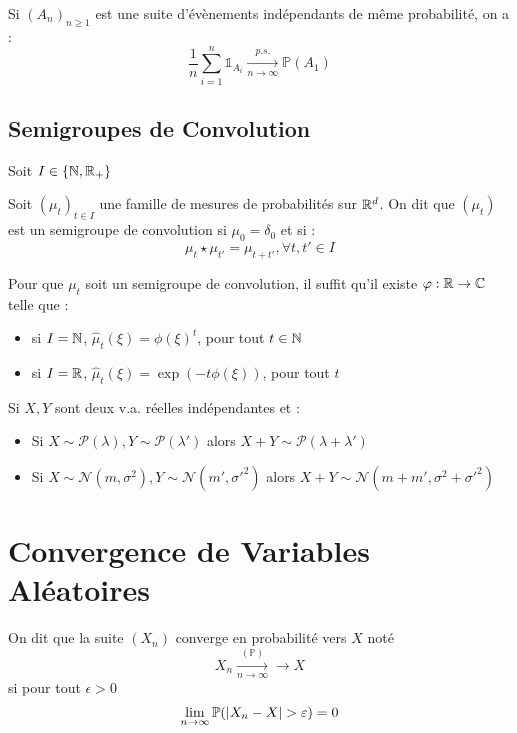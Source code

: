 \documentclass{cours}
\begin{document}
\begin{corollary}
    Si $\left(A_{n}\right)_{n \geq 1}$ est une suite d'évènements indépendants de même probabilité, on a :
    \[
        \frac{1}{n}\sum_{i = 1}^{n}\mathds{1}_{A_{i}} \xrightarrow[n \to \infty]{p.s.} \mathbb{P}(A_{1})
    \]
\end{corollary}

\subsection{Semigroupes de Convolution}
Soit $I \in \left\{\mathbb{N}, \mathbb{R}_{+}\right\}$
\begin{definition}
    Soit $(\mu_{t})_{t\in I}$ une famille de mesures de probabilités sur $\mathbb{R}^{d}$. On dit que $\left(\mu_{t}\right)$ est un semigroupe de convolution si $\mu_{0} = \delta_{0}$ et si :
    \[
        \mu_{t} \star \mu_{t'} = \mu_{t + t'}, \forall t, t' \in I
    \]
\end{definition}
\begin{lemma}
    Pour que $\mu_{t}$ soit un semigroupe de convolution, il suffit qu'il existe $\varphi : \mathbb{R} \rightarrow \mathbb{C}$ telle que :
    \begin{itemize}
        \item si $I = \mathbb{N}$, $\hat{\mu}_{t}(\xi) = \phi(\xi)^{t}$, pour tout $t \in \mathbb{N}$
        \item si $I = \mathbb{R}$, $\hat{\mu}_{t}(\xi) = \exp(-t\phi(\xi))$, pour tout $t$
    \end{itemize}
\end{lemma}
\begin{proposition}
    Si $X, Y$ sont deux v.a. réelles indépendantes et :
    \begin{itemize}
        \item Si $X \sim \mathcal{P}(\lambda), Y \sim \mathcal{P}(\lambda')$ alors $X + Y \sim \mathcal{P}(\lambda + \lambda')$
        \item Si $X \sim \mathcal{N}(m, \sigma^2), Y \sim \mathcal{N}(m', \sigma'^{2})$ alors $X + Y \sim \mathcal{N}(m + m', \sigma^{2} + \sigma'^{2})$
    \end{itemize}
\end{proposition}

\section{Convergence de Variables Aléatoires}
\begin{definition}
    On dit que la suite $(X_{n})$ converge en probabilité vers $X$ noté
    \[
        X_{n} \xrightarrow[n \to \infty]{(\mathbb{P})} \rightarrow X
    \]
    si pour tout $\epsilon > 0$
    \[
        \lim_{n \to \infty} \mathbb{P}(\left|X_{n} - X\right| > \varepsilon) = 0
    \]
\end{definition}
\end{document}
